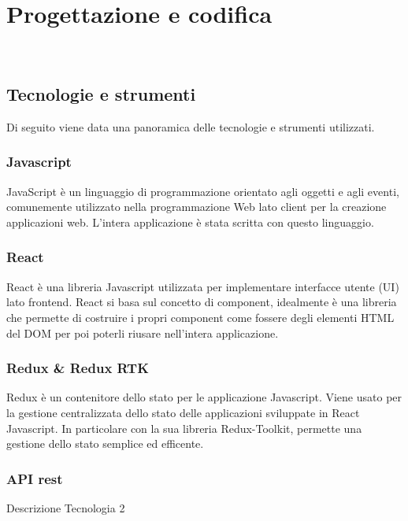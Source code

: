 
\chapter{Progettazione e codifica}
\label{cap:progettazione-codifica}

\\

\section{Tecnologie e strumenti}
\label{sec:tecnologie-strumenti}

Di seguito viene data una panoramica delle tecnologie e strumenti utilizzati.

\subsection*{Javascript}
JavaScript è un linguaggio di programmazione orientato agli oggetti e agli eventi, comunemente utilizzato nella programmazione Web lato client per la creazione applicazioni web. L'intera applicazione è stata scritta con questo linguaggio.

\subsection*{React}
React è una libreria Javascript utilizzata per implementare interfacce utente (UI) lato frontend. React si basa sul concetto di component, idealmente è una libreria che permette di costruire i propri component come fossere degli elementi HTML del DOM per poi poterli riusare nell'intera applicazione.

\subsection*{Redux \& Redux RTK}
Redux è un contenitore dello stato per le applicazione Javascript. Viene usato per la gestione centralizzata dello stato delle applicazioni sviluppate in React Javascript. In particolare con la sua libreria Redux-Toolkit, permette una gestione dello stato semplice ed efficente.

\subsection*{API rest}
Descrizione Tecnologia 2

